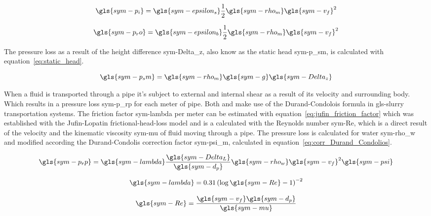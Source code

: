 \begin{equation}
    \label{eq:loss_inlet}
    \gls{sym-p_i} = \gls{sym-epsilon_s} \frac{1}{2} \gls{sym-rho_m} \gls{sym-v_f}^2
\end{equation}

\begin{equation}
    \label{eq:appendages_loss}
    \gls{sym-p_ro} = \gls{sym-epsilon_b} \frac{1}{2} \gls{sym-rho_m} \gls{sym-v_f}^2
\end{equation}

\noindent The pressure loss as a result of the height difference \gls{sym-Delta_z}, also know as the static head
\gls{sym-p_sm}, is calculated with equation~\ref{eq:static_head}.

\begin{equation}
    \label{eq:static_head}
    \gls{sym-p_sm} = \gls{sym-rho_m} \gls{sym-g} \gls{sym-Delta_z}
\end{equation}

When a fluid is transported through a pipe it's subject to external and internal shear as a result of its velocity and
surrounding body. Which results in a pressure loss \gls{sym-p_rp} for each meter of pipe. Both
\citet{van_den_berg_ihc_2013} and \citet{miedema_slurry_2016} make use of the Durand-Condolois formula in
\gls{gls-slurry} transportation systems. The friction factor \gls{sym-lambda} per meter can be estimated with
equation~\ref{eq:jufin_friction_factor} which was established with the Jufin-Lopatin frictional-head-loss model and is a
calculated with the Reynolds number \gls{sym-Re}, which is a direct result of the velocity and the kinematic viscosity
\gls{sym-mu} of fluid moving through a pipe. The pressure loss is calculated for water \gls{sym-rho_w} and modified
according the Durand-Condolis correction factor \gls{sym-psi_m}, calculated in equation~\ref{eq:corr_Durand_Condolios}.

\begin{equation}
    \label{eq:loss_due_length}
    \gls{sym-p_rp} = \gls{sym-lambda} \frac{\gls{sym-Delta_L}}{\gls{sym-d_p}} \gls{sym-rho_w} \gls{sym-v_f}^2 
	\gls{sym-psi}
\end{equation}

\begin{equation}
    \label{eq:jufin_friction_factor}
    \gls{sym-lambda} =  0.31 \left(\log \gls{sym-Re} - 1\right)^{-2}
\end{equation}

\begin{equation}
    \label{eq:reynoldsnumber}
    \gls{sym-Re} = \frac{\gls{sym-v_f} \gls{sym-d_p}}{\gls{sym-mu}}
\end{equation}

